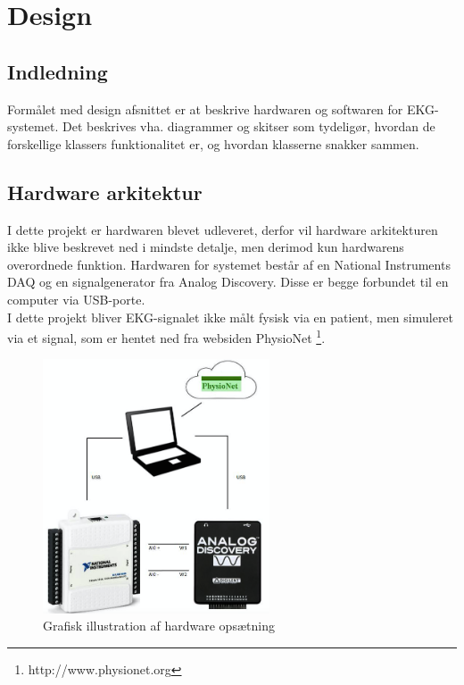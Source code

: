 \chapter{Design}

\section{Indledning}
Formålet med design afsnittet er at beskrive hardwaren og softwaren for EKG-systemet. Det beskrives vha.  diagrammer og skitser som tydeligør, hvordan de forskellige klassers funktionalitet er, og hvordan klasserne snakker sammen.
  
\section{Hardware arkitektur}
I dette projekt er hardwaren blevet udleveret, derfor vil hardware arkitekturen ikke blive beskrevet ned i mindste detalje, men derimod kun hardwarens overordnede funktion. Hardwaren for systemet består af en National Instruments DAQ og en signalgenerator fra Analog Discovery. Disse er begge forbundet til en computer via USB-porte.
\\ 
I dette projekt bliver EKG-signalet ikke målt fysisk via en patient, men simuleret via et signal, som er hentet ned fra websiden PhysioNet \footnote{http://www.physionet.org}. 

\begin{figure}[H]
	\centering
	\includegraphics[width=0.6\textwidth]{Figurer/Snip20150427_1}
	\caption{Grafisk illustration af hardware opsætning}
\end{figure}


